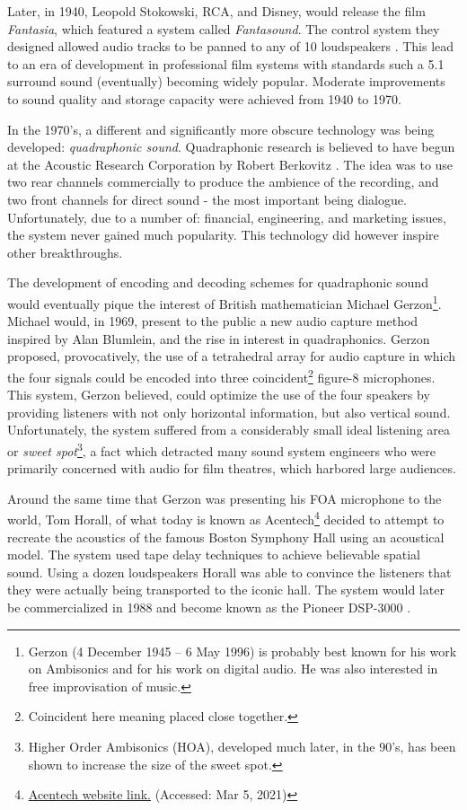 Later, in 1940, Leopold Stokowski, RCA, and Disney, would release the film \textit{Fantasia}, which featured a system called \textit{Fantasound}. The control system they designed allowed audio tracks to be panned to any of 10 loudspeakers \cite{klapholz1991fantasia}. This lead to an era of development in professional film systems with standards such a 5.1 surround sound (eventually) becoming widely popular. Moderate improvements to sound quality and storage capacity were achieved from 1940 to 1970.

In the 1970's, a different and significantly more obscure technology was being developed: \textit{quadraphonic sound}. Quadraphonic research is believed to have begun at the Acoustic Research Corporation by Robert Berkovitz \cite{davis2003history}. The idea was to use two rear channels commercially to produce the ambience of the recording, and two front channels for direct sound - the most important being dialogue. Unfortunately, due to a number of: financial, engineering, and marketing issues, the system never gained much popularity. This technology did however inspire other breakthroughs.

The development of encoding and decoding schemes for quadraphonic sound would eventually pique the interest of British mathematician Michael Gerzon\footnote{Gerzon (4 December 1945 – 6 May 1996) is probably best known for his work on Ambisonics and for his work on digital audio. He was also interested in free improvisation of music.}. Michael would, in 1969, present to the public a new audio capture method inspired by Alan Blumlein, and the rise in interest in quadraphonics. Gerzon proposed, provocatively, the use of a tetrahedral array for audio capture in which the four signals could be encoded into three coincident\footnote{Coincident here meaning placed close together.} figure-8 microphones. This system, Gerzon believed, could optimize the use of the four speakers by providing listeners with not only horizontal information, but also vertical sound. Unfortunately, the system suffered from a considerably small ideal listening area or \textit{sweet spot}\footnote{Higher Order Ambisonics (HOA), developed much later, in the 90's, has been shown to increase the size of the sweet spot.}, a fact which detracted many sound system engineers who were primarily concerned with audio for film theatres, which harbored large audiences.

Around the same time that Gerzon was presenting his FOA microphone to the world, Tom Horall, of what today is known as Acentech\footnote{\href{https://www.acentech.com/}{Acentech website link.} (Accessed: Mar 5, 2021)} decided to attempt to recreate the acoustics of the famous Boston Symphony Hall using an acoustical model. The system used tape delay techniques to achieve believable spatial sound. Using a dozen loudspeakers Horall was able to convince the listeners that they were actually being transported to the iconic hall. The system would later be commercialized in 1988 and become known as the Pioneer DSP-3000 \cite{davis2003history}. 

